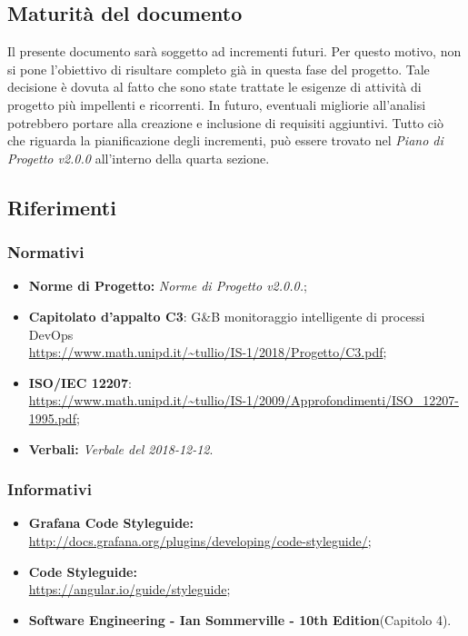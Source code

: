 \subsection{Maturità del documento}
Il presente documento sarà soggetto ad incrementi futuri. Per questo motivo, non si pone l'obiettivo di risultare completo già in questa fase del progetto.
Tale decisione è dovuta al fatto che sono state trattate le esigenze di attività di progetto più impellenti e ricorrenti.
In futuro, eventuali migliorie all'analisi potrebbero portare alla creazione e inclusione di requisiti aggiuntivi.
Tutto ciò che riguarda la pianificazione degli incrementi, può essere trovato nel \emph{Piano di Progetto v2.0.0} all'interno della quarta sezione.
\subsection{Riferimenti}
\subsubsection{Normativi}
\begin{itemize}
	\item \textbf{Norme di Progetto:} \emph{Norme di Progetto v2.0.0.};
	\item \textbf{Capitolato d'appalto C3}: G\&B monitoraggio intelligente di processi DevOps \\
	\url{https://www.math.unipd.it/~tullio/IS-1/2018/Progetto/C3.pdf};
	\item \textbf{ISO/IEC 12207}:\\ \url{https://www.math.unipd.it/~tullio/IS-1/2009/Approfondimenti/ISO_12207-1995.pdf};
	\item \textbf{Verbali:} \emph{Verbale del 2018-12-12}.
\end{itemize}
\subsubsection{Informativi}
\begin{itemize}
	\item \textbf{Grafana Code Styleguide:} \\
	\url{http://docs.grafana.org/plugins/developing/code-styleguide/};
	\item \textbf{ Code Styleguide:} \\
	\url{https://angular.io/guide/styleguide};
	\item \textbf{Software Engineering - Ian Sommerville - 10th Edition}(Capitolo 4).
\end{itemize}
\pagebreak
